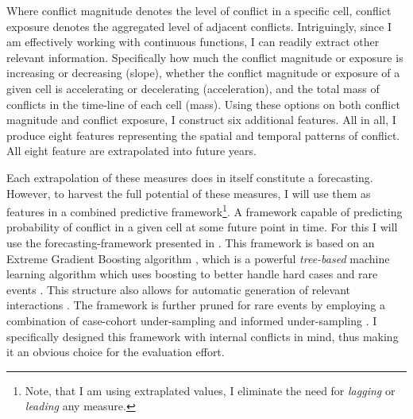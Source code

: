 \documentclass[a4paper]{article}
\begin{document}
Where conflict magnitude denotes the level of conflict in a specific cell, conflict exposure denotes the aggregated level of adjacent conflicts. Intriguingly, since I am effectively working with continuous functions, I can readily extract other relevant information. Specifically how much the conflict magnitude or exposure is increasing or decreasing (slope), whether the conflict magnitude or exposure of a given cell is accelerating or decelerating (acceleration), and the total mass of conflicts in the time-line of each cell (mass). Using these options on both conflict magnitude and conflict exposure, I construct six additional features. All in all, I produce eight features representing the spatial and temporal patterns of conflict. All eight feature are extrapolated into future years.\par

Each extrapolation of these measures does in itself constitute a forecasting. However, to harvest the full potential of these measures, I will use them as features in a combined predictive framework\footnote{Note, that I am using extraplated values, I eliminate the need for \emph{lagging} or \emph{leading} any measure.}. A framework capable of predicting probability of conflict in a given cell at some future point in time. For this I will use the forecasting-framework presented in \cite{Maase}. This framework is based on an Extreme Gradient Boosting algorithm \citep{Chen_2016}, which is a powerful \emph{tree-based} machine learning algorithm which uses boosting to better handle hard cases and rare events \citep[X]{Chen_2016}. This structure also allows for automatic generation of relevant interactions \citep[305-310]{Friedman_2001}. The framework is further pruned for rare events by employing a combination of case-cohort under-sampling \citep[142]{King_Zeng_2001} and informed under-sampling \cite[1267]{He_2008}. I specifically designed this framework with internal conflicts in mind, thus making it an obvious choice for the evaluation effort.\par 

%

\end{document}
